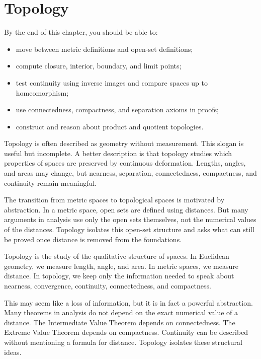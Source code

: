 \chapter{Topology}

\begin{learningobjectives}
By the end of this chapter, you should be able to:
\begin{itemize}
    \item move between metric definitions and open-set definitions;
    \item compute closure, interior, boundary, and limit points;
    \item test continuity using inverse images and compare spaces up to homeomorphism;
    \item use connectedness, compactness, and separation axioms in proofs;
    \item construct and reason about product and quotient topologies.
\end{itemize}
\end{learningobjectives}


Topology is often described as geometry without measurement. This slogan is useful but incomplete. A better description is that topology studies which properties of spaces are preserved by continuous deformation. Lengths, angles, and areas may change, but nearness, separation, connectedness, compactness, and continuity remain meaningful.

The transition from metric spaces to topological spaces is motivated by abstraction. In a metric space, open sets are defined using distances. But many arguments in analysis use only the open sets themselves, not the numerical values of the distances. Topology isolates this open-set structure and asks what can still be proved once distance is removed from the foundations.

Topology is the study of the qualitative structure of spaces. In Euclidean geometry, we measure length, angle, and area. In metric spaces, we measure distance. In topology, we keep only the information needed to speak about nearness, convergence, continuity, connectedness, and compactness.

This may seem like a loss of information, but it is in fact a powerful abstraction. Many theorems in analysis do not depend on the exact numerical value of a distance. The Intermediate Value Theorem depends on connectedness. The Extreme Value Theorem depends on compactness. Continuity can be described without mentioning a formula for distance. Topology isolates these structural ideas.

